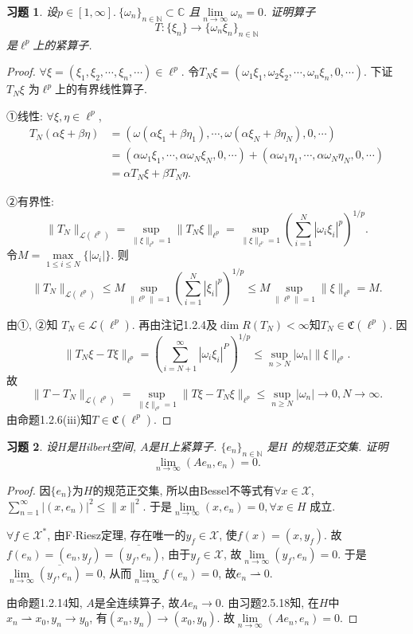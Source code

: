 \documentclass[UTF8,twoside]{ctexbook}
\newtheorem{exercise}{习题}[section]
\newcommand{\h}{\mathscr}
\newcommand{\kx}{\mathbb}
\numberwithin{equation}{section}
\begin{document}
	\begin{exercise}
		设$p\in[1,\infty].\ \{\omega_n\}_{n\in \kx N}\subset\kx C$ 且$\lim\limits_{n\rightarrow\infty}\omega_n=0$. 证明算子
		\[
		T : \{\xi_n\}\rightarrow\{\omega_n\xi_n\}_{n\in\kx N}
		\]
		是$\ell^p$上的紧算子.
	\end{exercise}
	\begin{proof}
		$\forall \xi=(\xi_1,\xi_2,\cdots,\xi_n,\cdots)\in\ell^p$. 令$T_N\xi=(\omega_1\xi_1,\omega_2\xi_2,\cdots,\omega_n\xi_n,0,\cdots)$. 下证$T_N\xi$ 为$\ell^p$上的有界线性算子.

		①线性: $\forall \xi,\eta\in\ell^p$,
		\[
		\begin{aligned}
		T_N(\alpha\xi+\beta\eta)&=(\omega(\alpha\xi_1+\beta\eta_1),\cdots,\omega(\alpha\xi_N+\beta\eta_N),0,\cdots)\\
		&=(\alpha\omega_1\xi_1,\cdots,\alpha\omega_N\xi_N,0,\cdots)+(\alpha\omega_1\eta_1,\cdots,\alpha\omega_N\eta_N,0,\cdots)\\
		&=\alpha T_N\xi+\beta T_N \eta.
		\end{aligned}
		\]

		②有界性: \[
		\|T_N\|_{\h L(\ell^p)}=\sup\limits_{\|\xi\|_{\ell^p}=1}\|T_N\xi\|_{\ell^p}=
		\sup\limits_{\|\xi\|_{\ell^p}=1}\left(
		\sum_{i=1}^N|\omega_i\xi_i|^p
		\right)^{1/p}.
		\]
		令$M=\max\limits_{1\leq i\leq N}\{|\omega_i|\}$. 则
		\[
		\|T_N\|_{\h L(\ell^p)}
		\leq M\sup_{\|\ell^p\|=1}\left(\sum_{i=1}^N|\xi_i|^p\right)^{1/p}
		\leq M \sup_{\|\ell^p\|=1}\|\xi\|_{\ell^p}=M.
		\]

		由①, ②知 $T_N\in\h L(\ell^p)$. 再由注记1.2.4及$\dim R(T_N)<\infty$知$T_N\in\mathfrak C(\ell^p)$. 因
		\[
		\|T_N\xi-T\xi\|_{\ell^p}=\left(\sum_{i=N+1}^\infty|\omega_i\xi_i|^P\right)^{1/p}\leq
		\sup_{n>N}|\omega_n|\|\xi\|_{\ell^p}.
		\]
		故
		\[
		\|T-T_N\|_{\h L(\ell^p)}=\sup_{\|\xi\|_{\ell^p}=1}\|T\xi-T_N\xi\|_{\ell^p}\leq\sup_{n\geq N}|\omega_n|\rightarrow 0, N\rightarrow\infty.
		\]
		由命题1.2.6(iii)知$T\in\mathfrak C(\ell^p)$.
	\end{proof}
	\begin{exercise}
		设$H$是Hilbert空间, $A$是$H$上紧算子. $\{e_n\}_{n\in\kx N}$ 是$H$ 的规范正交集. 证明
		\[
		\lim_{n\rightarrow\infty}(Ae_n,e_n)=0.
		\]
	\end{exercise}
	\begin{proof}
		因$\{e_n\}$为$H$的规范正交集, 所以由Bessel不等式有$\forall x\in\h X$, $\sum_{n=1}^\infty|(x,e_n)|^2\leq\|x\|^2$. 于是$\lim\limits_{n\rightarrow\infty}(x,e_n)=0, \forall x\in H$ 成立.

		$\forall f\in\h X^*$, 由F$\cdot$Riesz定理, 存在唯一的$y_f\in\h X$, 使$f(x)=(x,y_f)$. 故$f(e_n)=(e_n,y_f)=\overline{(y_f,e_n)}$, 由于$y_f\in\h X$, 故$\lim\limits_{n\rightarrow\infty}(y_f,e_n)=0$. 于是$\lim\limits_{n\rightarrow\infty}\overline{(y_f,e_n)}=0$, 从而$\lim\limits_{n\rightarrow\infty}f(e_n)=0$, 故$e_n\rightharpoonup 0$.

		由命题1.2.14知, $A$是全连续算子, 故$Ae_n\rightarrow 0$. 由\cite{zgq1990}习题2.5.18知, 在$H$中$x_n\rightharpoonup x_0, y_n\rightarrow y_0$, 有$(x_n,y_n)\rightarrow(x_0,y_0)$. 故$\lim\limits_{n\rightarrow\infty}(Ae_n,e_n)=0$.
	\end{proof}
\end{document}
